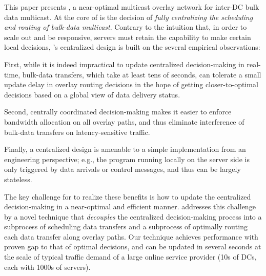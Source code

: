 This paper presents {\em \name}, a near-optimal multicast
overlay network for inter-DC bulk data multicast.
At the core of \name is the decision of {\em fully centralizing
the scheduling and routing of bulk-data multicast}.
Contrary to the intuition that, in order to scale out
and be responsive, servers must retain the capability to make
certain local decisions, \name's centralized design 
is built on the several empirical observations:
\begin{packeditemize}
\item First, while it is indeed impractical to update centralized
decision-making in real-time, bulk-data transfers, which take
at least tens of seconds, can tolerate a small update delay in
overlay routing decisions
in the hope of getting closer-to-optimal decisions based on
a global view of data delivery status.
\item Second, centrally coordinated decision-making makes it easier
to enforce bandwidth allocation on all overlay paths,
and thus eliminate interference of bulk-data
transfers on latency-sensitive traffic.
\item Finally, a centralized design is amenable to a simple
implementation from an engineering perspective;
e.g., the program running locally on the server side is
only triggered by data arrivals or control messages, and
thus can be largely stateless.
\end{packeditemize}


The key challenge for \name to realize these benefits is how to
update the centralized decision-making in a near-optimal and
efficient manner.
\name addresses this challenge by a novel technique that 
{\em decouples} the centralized decision-making process into a 
subprocess of scheduling data transfers and a subprocess of 
optimally routing each data transfer along overlay paths.
Our technique achieves performance with proven gap to that of
optimal decisions, and can be updated in several seconds at the
scale of typical traffic demand of a large online service
provider (10s of DCs, each with 1000s of servers).


